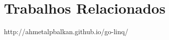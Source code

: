 \chapter{Trabalhos Relacionados}
\label{cha:related_work}

http://ahmetalpbalkan.github.io/go-linq/
